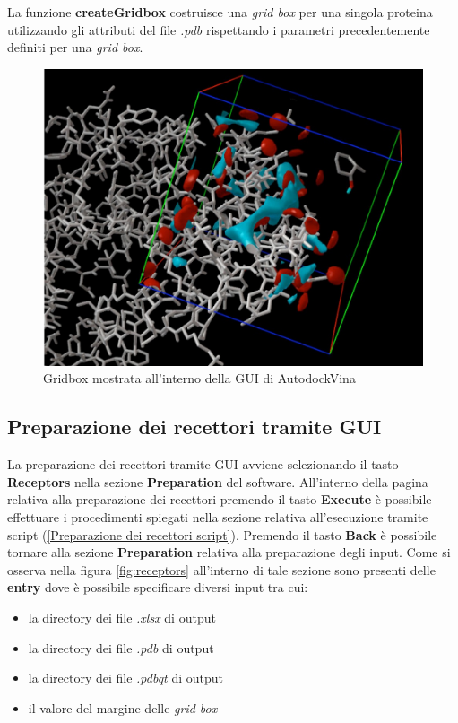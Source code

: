 La funzione \textbf{createGridbox} costruisce una \textit{grid box} per una singola proteina utilizzando gli attributi del file \textit{.pdb} rispettando i parametri precedentemente definiti per una \textit{grid box}.

\begin{figure}
    \centering
    \includegraphics[scale=0.7]{immagini/capitolo3/gridbox.jpg}
    \caption{Gridbox mostrata all'interno della GUI di AutodockVina}
    \label{fig:gridbox}
\end{figure}

\subsection{Preparazione dei recettori tramite GUI}
La preparazione dei recettori tramite GUI avviene selezionando il tasto \textbf{Receptors} nella sezione \textbf{Preparation} del software. All'interno della pagina relativa alla preparazione dei recettori premendo il tasto \textbf{Execute} è possibile effettuare i procedimenti spiegati nella sezione relativa all'esecuzione tramite script (\ref{Preparazione dei recettori script}). Premendo il tasto \textbf{Back} è possibile tornare alla sezione \textbf{Preparation} relativa alla preparazione degli input.
Come si osserva nella figura \ref{fig:receptors} all'interno di tale sezione sono presenti delle \textbf{entry} dove è possibile specificare diversi input tra cui:

\begin{itemize}
    \item la directory dei file \textit{.xlsx} di output
    \item la directory dei file \textit{.pdb} di output
    \item la directory dei file \textit{.pdbqt} di output
    \item il valore del margine delle \textit{grid box}
\end{itemize}

